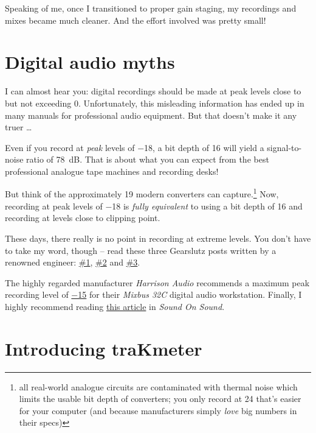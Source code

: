 Speaking of me, once I transitioned to proper gain staging, my
recordings and mixes became much cleaner.  And the effort involved was
pretty small!

\section{Digital audio myths}
\label{sec:digital_audio_myths}

I can almost hear you: digital recordings should be made at peak
levels close to but not exceeding \SI{0}{\dBFS}.  Unfortunately, this
misleading information has ended up in many manuals for professional
audio equipment.  But that doesn't make it any truer \dots

Even if you record at \emph{peak} levels of \SI{-18}{\dBFS}, a bit
depth of \SI{16}{\bits} will yield a signal-to-noise ratio of
\SI{78}{\dB}.  That is about what you can expect from the best
professional analogue tape machines and recording desks!

But think of the approximately \SI{19}{\bits} modern converters can
capture.\footnote{all real-world analogue circuits are contaminated
  with thermal noise which limits the usable bit depth of converters;
  you only record at \SI{24}{\bits} that's easier for your computer
  (and because manufacturers simply \emph{love} big numbers in their
  specs)} Now, recording at peak levels of \SI{-18}{\dBFS} is
\emph{fully equivalent} to using a bit depth of \SI{16}{\bits} and
recording at levels close to clipping point.

These days, there really is no point in recording at extreme levels.
You don't have to take my word, though -- read these three Gearslutz
posts written by a renowned engineer:
\href{https://www.gearslutz.com/board/showpost.php?p=10739624&postcount=9}{\#1},
\href{https://www.gearslutz.com/board/showpost.php?p=5063154&postcount=219}{\#2}
and
\href{https://www.gearslutz.com/board/showpost.php?p=9909382&postcount=96}{\#3}.

The highly regarded manufacturer \emph{Harrison Audio} recommends a
maximum peak recording level of
\href{http://www.harrisonconsoles.com/mixbus/mixbus32c-6-live-manual/1/en/topic/gain-staging}{\SI{-15}{\dBFS}}
for their \emph{Mixbus 32C} digital audio workstation.  Finally, I
highly recommend reading
\href{https://www.soundonsound.com/techniques/gain-staging-your-daw-software}{this
  article} in \emph{Sound On Sound}.

\section{Introducing traKmeter}
\label{sec:introducing_trakmeter}

